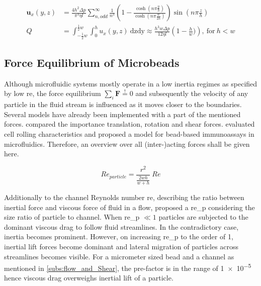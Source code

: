   \begin{align}
\mathbf{u}   _x(y,z) &= \frac{4 h^2 \Delta p}{\pi^3 \eta l} \sum_{n,odd}^{\infty} \frac{1}{n^3} \left( 1- \frac{\cosh (n \pi \frac{y}{h})}{\cosh (n \pi \frac{w}{2h})} \right) \sin (n \pi \frac{z}{h}) \label{eq:flowVelocityRect} \\
  Q    &= \int_{-\frac{1}{2}w}^{\frac{1}{2}w} \int_{0}^{h} u   _x(y,z) \ \mathrm{dzdy} \approx \frac{h^3 w \Delta p}{12 \eta l} \left( 1 - \frac{h}{w}) \right) \label{eq:flowRateRect} \mathrm{, \ for \ } h < w
\end{align}


\subsection{Force Equilibrium of Microbeads}
Although microfluidic systems mostly operate in a low inertia regimes as specified by low \gls{re}, the force equilibrium $\sum_{i} \mathbf{F} \overset{!}{=} 0$ and subsequently the velocity of any particle in the fluid stream is influenced as it moves closer to the boundaries. Several models have already been implemented with a part of the mentioned forces. \citet{lit:fluid:comparison} compared the importance translation, rotation and shear forces.\cite{lit:fluidics:RollingCharacteristics} evaluated cell rolling characteristics and \citet{lit:fluidic:ModelMIT} proposed a model for bead-based immunoassays in microfluidics. Therefore, an overview over all (inter-)acting forces shall be given here.

\begin{equation}
	\mathit{Re}_{particle} = \frac{r^2}{\frac{2wh}{w+h}} \ \mathit{Re} 
\end{equation}

Additionally to the channel Reynolds number \gls{re}, describing the ratio between inertial force and viscous force of fluid in a flow, \citet{lit:fluidic:f_wall} proposed a \gls{re_p} considering the size ratio of particle to channel. When \gls{re_p} $\ll 1$ particles are subjected to the dominant viscous drag to follow fluid streamlines. In the contradictory case, inertia becomes prominent. However, on increasing \gls{re_p} to the order of 1, inertial lift forces become dominant and lateral migration of particles across streamlines becomes visible.  For a micrometer sized bead and a channel as mentioned in \cref{subs:flow_and_Shear}, the pre-factor is in the range of \num{1e-5} hence viscous drag overweighs inertial lift of a particle.

